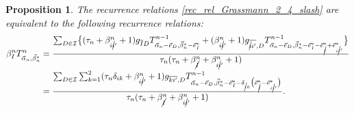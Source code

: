 \documentclass[10pt,a4paper]{amsart}
\numberwithin{equation}{section}
\newtheorem{Proposition}[Theorem]{Proposition}
 { \theoremstyle{definition}
\newtheorem{Definition}[Theorem]{Definition}
\newtheorem{Note}[Theorem]{Note}
\newtheorem{Example}[Theorem]{Example}
\newtheorem{Remark}[Theorem]{Remark} }
\begin{document}
\begin{Proposition}\label{Prop_G24_relation}
The recurrence relations \eqref{rec_rel_Grassmann_2_4_slash} are equivalent to the following recurrence relations:
\begin{align}
 \beta_{I}^{n}
 T^{n}_{\vec{\alpha}_{n},\vec{\beta}_{n}^{\ast}}
 &=
 \frac{
 \sum_{
 D
 \in
 \mathcal{I}
 }
 \bigl\{
 (
 \tau_{n}
 +
 \beta_{i\cancel{i}'}^{n}
 +
 1
 )
 g_{\overline{I}D}
 T^{n-1}_{
 \vec{\alpha}_{n}
 -
 \vec{e}_{D},
 \vec{\beta}_{n}^{\ast}
 -
 \vec{e}_{I}^{\ast}
 }
 +
 (
 \beta_{i\cancel{i}'}^{n}
 +
 1
 )
 g_{\overline{\cancel{i}i'},D}
 T^{n-1}_{
 \vec{\alpha}_{n}
 -
 \vec{e}_{D},
 \vec{\beta}_{n}^{\ast}
 -
 \vec{e}_{I}^{\ast}
 -
 \vec{e}_{\cancel{I}}^{\ast}
 +
 \vec{e}_{i\cancel{i}'}^{\ast}
 }
 \bigr\}
 }{
 \tau_{n}
 (
 \tau_{n}
 +
 \beta_{\cancel{I}}^{n}
 +
 \beta_{i\cancel{i}'}^{n}
 +
 1
 )
 }
 \nonumber
 \\
 &=
 \frac{
 \sum_{
 D
 \in
 \mathcal{I}
 }
 \sum_{k=1}^{2}
 (
 \tau_{n}
 \delta_{ik}
 +
 \beta_{i\cancel{i}'}^{n}
 +
 1
 )
 g_{\overline{ki'},D}
 T^{n-1}_{
 \vec{\alpha}_{n}
 -
 \vec{e}_{D},
 \vec{\beta}_{n}^{\ast}
 -
 \vec{e}_{I}^{\ast}
 -
 \delta_{\cancel{i}k}
 \bigl(
 \vec{e}_{\cancel{I}}^{\ast}
 -
 \vec{e}_{i\cancel{i}'}^{\ast}
 \bigr)
 }
 }{
 \tau_{n}
 (
 \tau_{n}
 +
 \beta_{\cancel{I}}^{n}
 +
 \beta_{i\cancel{i}'}^{n}
 +
 1
 )
 }.
\label{G24_n_relation}
\end{align}
\end{Proposition}
\end{document}
